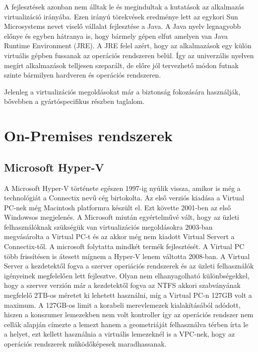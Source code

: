 \documentclass[12pt,oneside,justify]{book}
\begin{document}
A fejlesztések azonban nem álltak le és megindultak a kutatások az alkalmazás virtualizáció irányába. 
Ezen irányú törekvések eredménye lett az egykori Sun Microsystems nevet viselő vállalat fejlesztése a Java. 
A Java nyelv legnagyobb előnye és egyben hátranya is, hogy bármely gépen elfut amelyen van Java Runtime Environment (JRE). 
A JRE felel azért, hogy az alkalmazások egy külön virtuális gépben fussanak az operációs rendszeren belül. 
Így az univerzális nyelven megírt alkalmazások telljesen szeparált, de előre jól tervezhető módon futnak szinte bármilyen hardveren és operációs rendszeren.

Jelenleg a virtualizációs megoldásokat már a biztonság fokozására használják, bővebben a gyártóspecifikus részben taglalom.

\section{On-Premises rendszerek}

\subsection{Microsoft Hyper-V\texttrademark}

A Microsoft Hyper-V története egészen 1997-ig nyúlik vissza, amikor is még a technológiát a Connectix nevű cég birtokolta. 
Az első verziós kiadása a Virtual PC-nek még Macintosh platformra készült el. 
Ezt követte 2001-ben az első Windowsos megjelenés. 
A Microsoft miután egyértelművé vált, hogy az üzleti felhasználóknak szükségük van virtualizációs megoldásokra 2003-ban megvásárolta a Virtual PC-t és az akkor még nem kiadott Virtual Servert a Connectix-től. 
A microsoft folytatta mindkét termék fejlesztését. A Virtual PC több frissítésen is átesett mígnem a Hyper-V lenem váltotta 2008-ban. 
A Virtual Server a kezdetektől fogva a szerver operiációs rendszerek és az üzleti felhasználók igényeinek megfelelően lett fejlesztve. 
Olyan nem elhanyagolható különbségekkel, hogy a szerver verzión már a kezdetektől fogva az NTFS akkori szabványának megfelelő 2TB-os méretet ki lehetett használni, míg a Virtual PC-n 127GB volt a maximum. 
A 127GB-os limit a korabeli merevlemezek kialakításából adódott, hiszen a konszumer lemezekben nem volt kontroller így az operációs rendszer nem cellák alapján címezte a lemezt hanem a geometriáját felhasználva térben írta le a helyet, ezt kellett használnia a virtuális lemezeknél is a VPC-nek, hogy az operációs rendszerek működőképesek maradhassanak.
\end{document}

